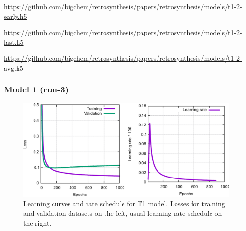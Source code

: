 \documentclass{article}
\begin{document}
\url{https://github.com/bigchem/retrosynthesis/papers/retrosynthesis/models/t1-2-early.h5}

\url{https://github.com/bigchem/retrosynthesis/papers/retrosynthesis/models/t1-2-last.h5}

\url{https://github.com/bigchem/retrosynthesis/papers/retrosynthesis/models/t1-2-avg.h5}

\newpage

\subsubsection{Model 1 (run-3)}
  
\begin{figure}[h!]
  \centering
  \includegraphics[width = 16.5cm]{images/t1-3.pdf}
  \caption{Learning curves and rate schedule for T1 model. Losses for training and validation datasets on the left, usual learning rate schedule on the right.}
  \label{fig:t11}
\end{figure}
\end{document}
